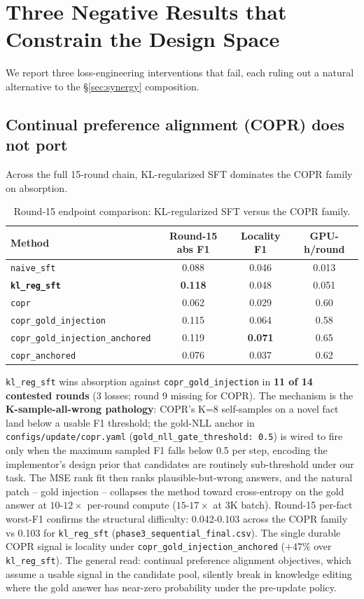 \documentclass[11pt]{article}
\newcommand{\code}[1]{\texttt{\small #1}}
\begin{document}
\section{Three Negative Results that Constrain the Design Space}
\label{sec:negatives}

We report three loss-engineering interventions that fail, each ruling out a
natural alternative to the \S\ref{sec:synergy} composition.

\subsection{Continual preference alignment (COPR) does not port}

Across the full 15-round chain, KL-regularized SFT dominates the COPR
family on absorption.

\begin{table}[h]
\centering
\small
\begin{tabular}{lccc}
\toprule
Method & Round-15 abs F1 & Locality F1 & GPU-h/round \\
\midrule
\code{naive\_sft}                       & 0.088 & 0.046 & 0.013 \\
\textbf{\code{kl\_reg\_sft}}            & \textbf{0.118} & 0.048 & 0.051 \\
\code{copr}                             & 0.062 & 0.029 & 0.60 \\
\code{copr\_gold\_injection}            & 0.115 & 0.064 & 0.58 \\
\code{copr\_gold\_injection\_anchored}  & 0.119 & \textbf{0.071} & 0.65 \\
\code{copr\_anchored}                   & 0.076 & 0.037 & 0.62 \\
\bottomrule
\end{tabular}
\caption{Round-15 endpoint comparison: KL-regularized SFT versus the COPR family.}
\label{tab:copr}
\end{table}

\code{kl\_reg\_sft} wins absorption against \code{copr\_gold\_injection} in
\textbf{11 of 14 contested rounds} (3 losses; round 9 missing for COPR).
The mechanism is the \textbf{K-sample-all-wrong pathology}: COPR's K=8
self-samples on a novel fact land below a usable F1 threshold; the
gold-NLL anchor in \code{configs/update/copr.yaml}
(\code{gold\_nll\_gate\_threshold: 0.5}) is wired to fire only when the
maximum sampled F1 falls below 0.5 per step, encoding the implementor's
design prior that candidates are routinely sub-threshold under our task.
The MSE rank fit then ranks plausible-but-wrong answers, and the natural
patch -- gold injection -- collapses the method toward cross-entropy on
the gold answer at $10$-$12\times$ per-round compute ($15$-$17\times$ at
3K batch). Round-15 per-fact worst-F1 confirms the structural difficulty:
0.042-0.103 across the COPR family vs 0.103 for \code{kl\_reg\_sft}
(\code{phase3\_sequential\_final.csv}). The single durable COPR signal is
locality under \code{copr\_gold\_injection\_anchored} ($+47\%$ over
\code{kl\_reg\_sft}). The general read: continual preference alignment
objectives, which assume a usable signal in the candidate pool, silently
break in knowledge editing where the gold answer has near-zero probability
under the pre-update policy.
\end{document}
